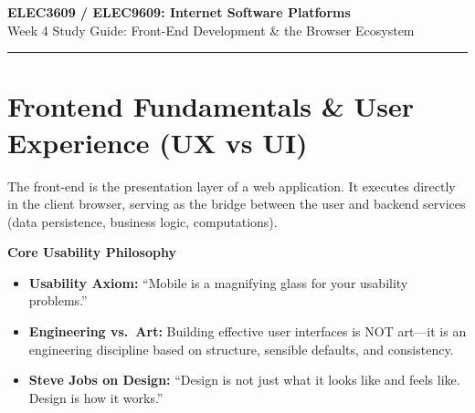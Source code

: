 \documentclass[8pt, a4paper]{article}
\begin{document}
\begin{center}
  {\LARGE\bfseries\color{accentblue} ELEC3609 / ELEC9609: Internet Software Platforms}\\[6pt]
  {\large Week 4 Study Guide: Front-End Development \& the Browser Ecosystem}
\end{center}

\vspace{12pt}
\textcolor{rulegray}{\rule{\linewidth}{1pt}}
\vspace{6pt}

\section{Frontend Fundamentals \& User Experience (UX vs UI)}

The front-end is the presentation layer of a web application. It executes directly in the client browser,
serving as the bridge between the user and backend services (data persistence, business logic, computations).

\begin{conceptbox}
\textbf{Core Usability Philosophy}
\begin{itemize}
  \item \textbf{Usability Axiom:} ``Mobile is a magnifying glass for your usability problems.''
  \item \textbf{Engineering vs.\ Art:} Building effective user interfaces is NOT art---it is an engineering
        discipline based on structure, sensible defaults, and consistency.
  \item \textbf{Steve Jobs on Design:} ``Design is not just what it looks like and feels like. Design is how it works.''
\end{itemize}
\end{conceptbox}
\end{document}
